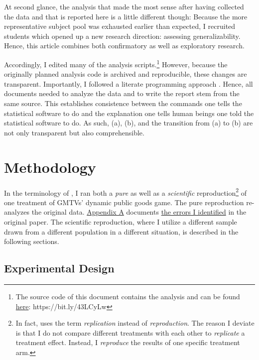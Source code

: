 \documentclass[
  authoryear,
  review,
  3p,
  onecolumn]{elsarticle}
\begin{document}
At second glance, the analysis that made the most sense after having
collected the data and that is reported here is a little different
though: Because the more representative subject pool was exhausted
earlier than expected, I recruited students which opened up a new
research direction: assessing generalizability. Hence, this article
combines both confirmatory as well as exploratory research.

Accordingly, I edited many of the analysis scripts.\footnote{The source
  code of this document contains the analysis and can be found
  \href{https://github.com/Howquez/GMTV/blob/main/analysis/article/paper.qmd}{here}:
  https://bit.ly/43LCyLw} However, because the originally planned
analysis code is archived and reproducible, these changes are
transparent. Importantly, I followed a literate programming approach
\citep{Knuth_1984, AkhtarYe_2023}. Hence, all documents needed to
analyze the data and to write the report stem from the same source. This
establishes consistence between the commands one tells the statistical
software to do and the explanation one tells human beings one told the
statistical software to do. As such, (a), (b), and the transition from
(a) to (b) are not only transparent but also comprehensible.

\hypertarget{sec-methods}{%
\section{Methodology}\label{sec-methods}}

In the terminology of \citet{Hamermesh2007}, I ran both a \emph{pure} as
well as a \emph{scientific} reproduction\footnote{In fact,
  \citet{Hamermesh2007} uses the term \emph{replication} instead of
  \emph{reproduction}. The reason I deviate is that I do not compare
  different treatments with each other to \emph{replicate} a treatment
  effect. Instead, I \emph{reproduce} the results of one specific
  treatment arm.} of one treatment of GMTVs' dynamic public goods game.
The pure reproduction re-analyzes the original data.
\protect\hyperlink{A:-Pure-Replication}{Appendix A} documents
\href{}{the errors I identified} in the original paper. The scientific
reproduction, where I utilize a different sample drawn from a different
population in a different situation, is described in the following
sections.

\hypertarget{sec-design}{%
\subsection{Experimental Design}\label{sec-design}}
\end{document}
